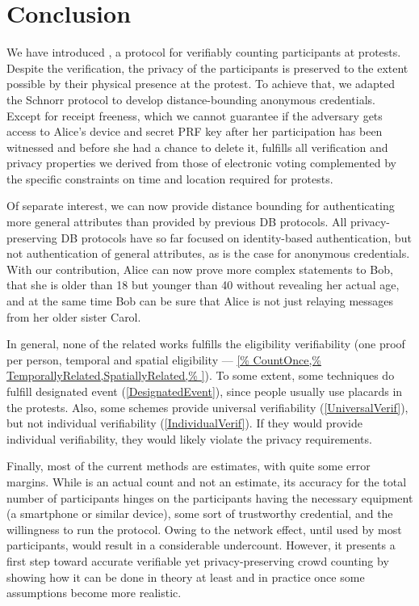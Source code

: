 \section{Conclusion}%
\label{Conclusion}

We have introduced \PRIVO, a protocol for verifiably counting participants at protests. Despite the verification, the privacy of the
participants is preserved to the extent possible by their physical
presence at the protest. To achieve that, we adapted the Schnorr
protocol to develop distance-bounding anonymous credentials. Except for receipt
freeness, which we cannot guarantee if the adversary gets access to
Alice's device and secret PRF key after her participation has
been witnessed and before she had a chance to
delete it, \PRIVO
fulfills all verification and privacy properties we derived from those
of electronic voting complemented by the specific constraints on time
and location required for protests. 

Of separate interest, we can now provide distance bounding for authenticating 
more general attributes than provided by previous \ac{DB} protocols.
All privacy-preserving \ac{DB} protocols have so far focused on identity-based 
authentication, but not authentication of general attributes, as is the case 
for anonymous credentials.
With our contribution, Alice can now prove more complex statements to Bob, \eg 
that she is older than 18 but younger than 40 without revealing her actual age,  
and at the same time Bob can be sure that Alice is not just relaying messages 
from her older sister Carol.

In general, none of the related works fulfills the eligibility
verifiability (one proof per person, temporal and spatial eligibility ---
\cref{%
  CountOnce,%
  TemporallyRelated,SpatiallyRelated,%
}).
To some extent, some techniques do fulfill designated event (\cref{DesignatedEvent}), since people 
usually use placards in the protests.
Also, some schemes provide universal verifiability (\cref{UniversalVerif}), but 
not individual verifiability (\cref{IndividualVerif}).
If they would provide individual verifiability, they would likely violate the 
privacy requirements.

Finally, most of the current methods are estimates, with quite some error 
margins. While \PRIVO is an actual count and not an estimate, its
accuracy for the total number of participants hinges on the
participants having the necessary equipment (a smartphone or similar
device), some sort of trustworthy credential, and the willingness to
run the protocol. Owing to the network effect, until used by most participants, \PRIVO would result in a
considerable undercount. However, it presents a first
step toward accurate verifiable yet privacy-preserving crowd counting
by showing how it can be done in theory at least and in practice once
some assumptions become more realistic. 

